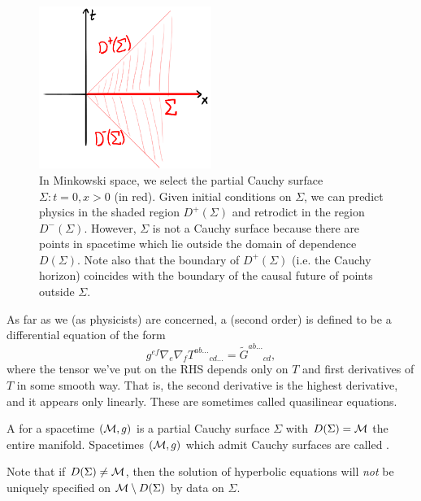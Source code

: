 \begin{figure}
    \centering
    \includegraphics[width=0.5\textwidth]{2019/01/20190130_domainofdependence.png}
    \caption{In Minkowski space, we select the partial Cauchy surface $\Sigma:t=0,x>0$ (in red). Given initial conditions on $\Sigma$, we can predict physics in the shaded region $D^+(\Sigma)$ and retrodict in the region $D^-(\Sigma)$. However, $\Sigma$ is not a Cauchy surface because there are points in spacetime which lie outside the domain of dependence $D(\Sigma)$. Note also that the boundary of $D^+(\Sigma)$ (i.e. the Cauchy horizon) coincides with the boundary of the causal future of points outside $\Sigma$.}
    \label{fig:domainofdependence}
\end{figure}
\begin{defn}
    As far as we (as physicists) are concerned, a  (second order) is defined to be a differential equation of the form
    \begin{equation}
        g^{ef} \nabla_e \nabla_f T^{ab\ldots}{}_{cd\ldots} = \tilde G^{ab\ldots}{}_{cd},
    \end{equation}
    where the tensor we've put on the RHS depends only on $T$ and first derivatives of $T$ in some smooth way. That is, the second derivative is the highest derivative, and it appears only linearly. These are sometimes called quasilinear equations.
\end{defn}
\begin{defn}
    A  for a spacetime $(\mathcal{M},g)$ is a partial Cauchy surface $\Sigma$ with $D(\Sigma)=\mathcal{M}$ the entire manifold. Spacetimes $(\mathcal{M},g)$ which admit Cauchy surfaces are called .
\end{defn}
Note that if $D(\Sigma)\neq \mathcal{M}$, then the solution of hyperbolic equations will \emph{not} be uniquely specified on $\mathcal{M}\setminus D(\Sigma)$ by data on $\Sigma$.
